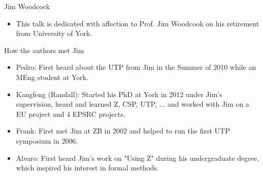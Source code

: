 \documentclass[%
    slidestop,%
    compress,%
    mathserif,%
    table,%
    usenames,%
    aspectratio=169,
    dvipsnames,%
]{beamer}%
\begin{document}
\begin{frame}{Jim Woodcock}
    \begin{itemize}
        \item This talk is dedicated with affection to Prof. Jim Woodcook on his retirement from University of York.
    \end{itemize}


    \pause \begin{block}{How the authors met Jim}
    \begin{itemize}
        \pause \item Pedro: First heard about the UTP from Jim in the Summer of 2010 while an MEng student at York.
        \pause \item Kangfeng (Randall): Started his PhD at York in 2012 under Jim's supervision, heard and learned Z, CSP, UTP, ... and worked with Jim on a EU project and 4 EPSRC projects.
        \pause \item Frank: First met Jim at ZB in 2002 and helped to run the first UTP symposium in 2006.
        \pause \item Alvaro: First heard Jim's work on "Using Z" during his undergraduate degree, which inspired his interest in formal methods.
    \end{itemize}
    \end{block}




\end{frame}
\end{document}

